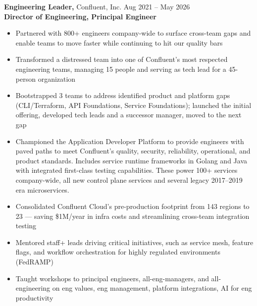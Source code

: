 \begin{resume}
{\bf Engineering Leader,} Confluent, Inc. \hfill Aug 2021 -- May 2026 \\
{\bf Director of Engineering, Principal Engineer}
\nopagebreak[4]
\begin{itemize} \itemsep -2pt  %
  \item Partnered with 800+ engineers company-wide to surface cross-team gaps and
        enable teams to move faster while continuing to hit our quality bars
  \item Transformed a distressed team into one of Confluent's most respected engineering teams,
        managing 15 people and serving as tech lead for a 45-person organization
  \item Bootstrapped 3 teams to address identified product and platform gaps
        (CLI/Terraform, API Foundations, Service Foundations); launched the initial offering, 
        developed tech leads and a successor manager, moved to the next gap
  \item Championed the Application Developer Platform to provide engineers with paved paths
        to meet Confluent's quality, security, reliability, operational, and product standards.
        Includes service runtime frameworks in Golang and Java with integrated first-class
        testing capabilities. These power 100+ services company-wide, all new control
        plane services and several legacy 2017--2019 era microservices.
  \item Consolidated Confluent Cloud's pre-production footprint from 143 regions to 23 --- saving 
        \$1M/year in infra costs and streamlining cross-team integration testing
  \item Mentored staff+ leads driving critical initiatives, such as service mesh, feature flags,
        and workflow orchestration for highly regulated environments (FedRAMP)
  \item Taught workshops to principal engineers, all-eng-managers, and all-engineering on eng values,
        eng management, platform integrations, AI for eng productivity
 \end{itemize}


\end{resume}
